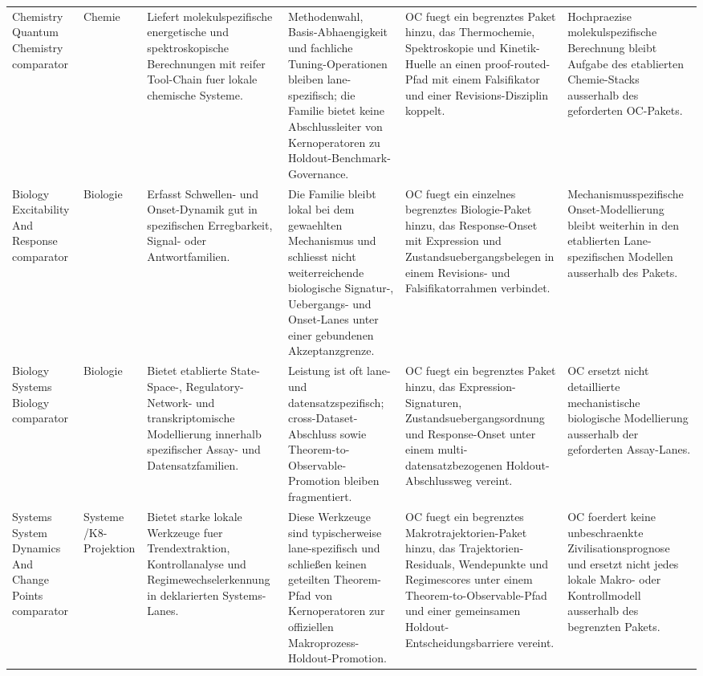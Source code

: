\begin{longtable}{@{}L{0.17\textwidth}L{0.09\textwidth}L{0.17\textwidth}L{0.17\textwidth}L{0.20\textwidth}L{0.14\textwidth}@{}}
Chemistry Quantum Chemistry comparator & Chemie & Liefert molekulspezifische energetische und spektroskopische Berechnungen mit reifer Tool-Chain fuer lokale chemische Systeme. & Methodenwahl, Basis-Abhaengigkeit und fachliche Tuning-Operationen bleiben lane-spezifisch; die Familie bietet keine Abschlussleiter von Kernoperatoren zu Holdout-Benchmark-Governance. & OC fuegt ein begrenztes Paket hinzu, das Thermochemie, Spektroskopie und Kinetik-Huelle an einen proof-routed-Pfad mit einem Falsifikator und einer Revisions-Disziplin koppelt. & Hochpraezise molekulspezifische Berechnung bleibt Aufgabe des etablierten Chemie-Stacks ausserhalb des geforderten OC-Pakets. \\
Biology Excitability And Response comparator & Biologie & Erfasst Schwellen- und Onset-Dynamik gut in spezifischen Erregbarkeit, Signal- oder Antwortfamilien. & Die Familie bleibt lokal bei dem gewaehlten Mechanismus und schliesst nicht weiterreichende biologische Signatur-, Uebergangs- und Onset-Lanes unter einer gebundenen Akzeptanzgrenze. & OC fuegt ein einzelnes begrenztes Biologie-Paket hinzu, das Response-Onset mit Expression und Zustandsuebergangsbelegen in einem Revisions- und Falsifikatorrahmen verbindet. & Mechanismusspezifische Onset-Modellierung bleibt weiterhin in den etablierten Lane-spezifischen Modellen ausserhalb des Pakets. \\
Biology Systems Biology comparator & Biologie & Bietet etablierte State-Space-, Regulatory-Network- und transkriptomische Modellierung innerhalb spezifischer Assay- und Datensatzfamilien. & Leistung ist oft lane- und datensatzspezifisch; cross-Dataset-Abschluss sowie Theorem-to-Observable-Promotion bleiben fragmentiert. & OC fuegt ein begrenztes Paket hinzu, das Expression-Signaturen, Zustandsuebergangsordnung und Response-Onset unter einem multi-datensatzbezogenen Holdout-Abschlussweg vereint. & OC ersetzt nicht detaillierte mechanistische biologische Modellierung ausserhalb der geforderten Assay-Lanes. \\
Systems System Dynamics And Change Points comparator & Systeme /\allowbreak K8-Projektion & Bietet starke lokale Werkzeuge fuer Trendextraktion, Kontrollanalyse und Regimewechselerkennung in deklarierten Systems-Lanes. & Diese Werkzeuge sind typischerweise lane-spezifisch und schließen keinen geteilten Theorem-Pfad von Kernoperatoren zur offiziellen Makroprozess-Holdout-Promotion. & OC fuegt ein begrenztes Makrotrajektorien-Paket hinzu, das Trajektorien-Residuals, Wendepunkte und Regimescores unter einem Theorem-to-Observable-Pfad und einer gemeinsamen Holdout-Entscheidungsbarriere vereint. & OC foerdert keine unbeschraenkte Zivilisationsprognose und ersetzt nicht jedes lokale Makro- oder Kontrollmodell ausserhalb des begrenzten Pakets. \\

\end{longtable}
